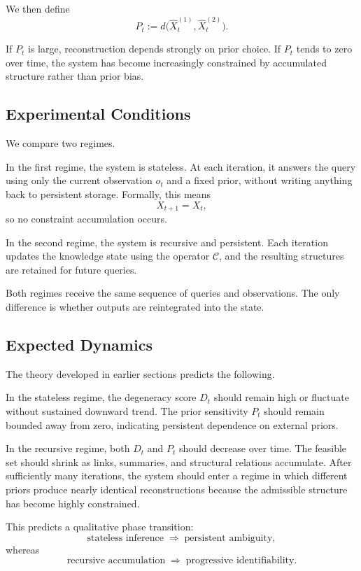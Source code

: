\documentclass[12pt, oneside]{article}
\theoremstyle{plain}
\theoremstyle{definition}
\theoremstyle{remark}
\begin{document}
We then define
\[
P_t := d\bigl(\hat{X}_t^{(1)}, \hat{X}_t^{(2)}\bigr).
\]

If $P_t$ is large, reconstruction depends strongly on prior choice. If $P_t$ tends to zero over time, the system has become increasingly constrained by accumulated structure rather than prior bias.

\subsection{Experimental Conditions}

We compare two regimes.

In the first regime, the system is stateless. At each iteration, it answers the query using only the current observation $o_t$ and a fixed prior, without writing anything back to persistent storage. Formally, this means
\[
X_{t+1} = X_t,
\]
so no constraint accumulation occurs.

In the second regime, the system is recursive and persistent. Each iteration updates the knowledge state using the operator $\mathcal{C}$, and the resulting structures are retained for future queries.

Both regimes receive the same sequence of queries and observations. The only difference is whether outputs are reintegrated into the state.

\subsection{Expected Dynamics}

The theory developed in earlier sections predicts the following.

In the stateless regime, the degeneracy score $D_t$ should remain high or fluctuate without sustained downward trend. The prior sensitivity $P_t$ should remain bounded away from zero, indicating persistent dependence on external priors.

In the recursive regime, both $D_t$ and $P_t$ should decrease over time. The feasible set should shrink as links, summaries, and structural relations accumulate. After sufficiently many iterations, the system should enter a regime in which different priors produce nearly identical reconstructions because the admissible structure has become highly constrained.

This predicts a qualitative phase transition:
\[
\text{stateless inference} \;\Rightarrow\; \text{persistent ambiguity},
\]
whereas
\[
\text{recursive accumulation} \;\Rightarrow\; \text{progressive identifiability}.
\]
\end{document}
